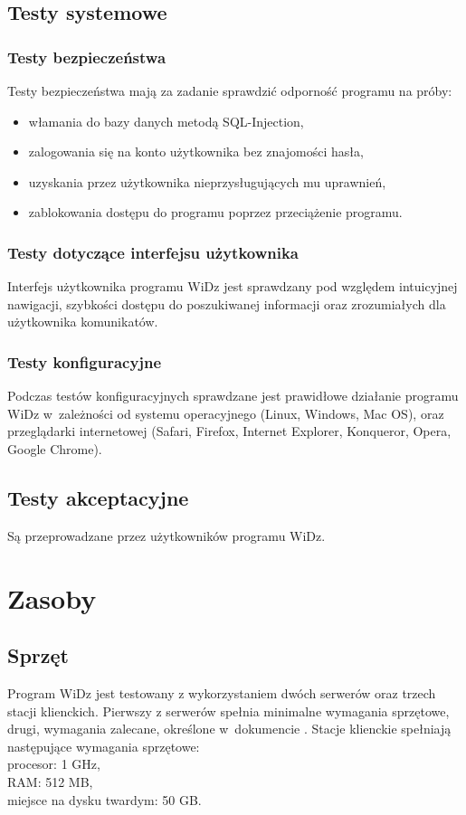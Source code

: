 \documentclass[12pt,leqno,twoside]{mwart}
\begin{document}
\subsection{Testy systemowe}
\subsubsection{Testy bezpieczeństwa}
\noindent Testy bezpieczeństwa mają za zadanie sprawdzić odporność programu na próby:
\begin{itemize}
	\item włamania do bazy danych metodą SQL-Injection,
	\item zalogowania się na konto użytkownika bez znajomości hasła,
	\item uzyskania przez użytkownika nieprzysługujących mu uprawnień,
	\item zablokowania dostępu do programu poprzez przeciążenie programu.
\end{itemize}
\subsubsection{Testy dotyczące interfejsu użytkownika}
\noindent Interfejs użytkownika programu WiDz jest sprawdzany pod względem intuicyjnej nawigacji, szybkości dostępu do poszukiwanej informacji oraz zrozumiałych dla użytkownika komunikatów. \\
\subsubsection{Testy konfiguracyjne}
\noindent Podczas testów konfiguracyjnych sprawdzane jest prawidłowe działanie programu WiDz w~zależności od systemu operacyjnego (Linux, Windows, Mac OS), oraz przeglądarki internetowej (Safari, Firefox, Internet Explorer, Konqueror, Opera, Google Chrome).\\
\subsection{Testy akceptacyjne}
\noindent Są przeprowadzane przez użytkowników programu WiDz. \\
\section{Zasoby}
\subsection{Sprzęt}
\noindent Program WiDz jest testowany z wykorzystaniem dwóch serwerów oraz trzech stacji klienckich. Pierwszy z serwerów spełnia minimalne wymagania sprzętowe, drugi, wymagania zalecane, określone w~dokumencie \cite{WYM}. Stacje klienckie spełniają następujące wymagania sprzętowe: \\
	\indent procesor: 1 GHz, \\
	\indent RAM: 512 MB, \\
	\indent miejsce na dysku twardym: 50 GB. \\
\end{document}
